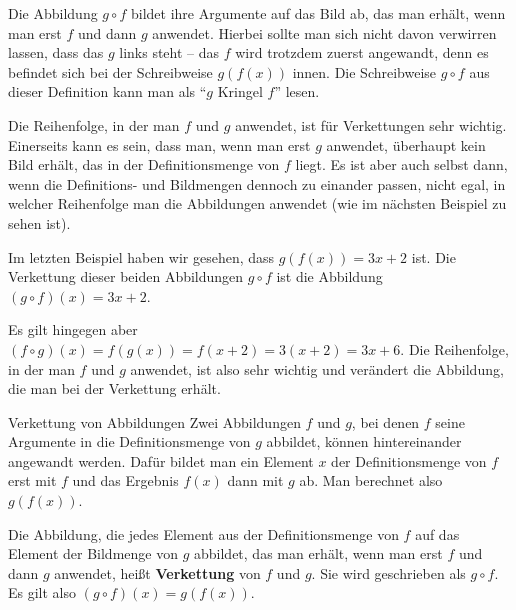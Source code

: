 \documentclass[../../main.tex]{subfiles}
\begin{document}
Die Abbildung $g\circ f$ bildet ihre Argumente auf das Bild ab, das man erhält, wenn man erst $f$ und dann $g$ anwendet. Hierbei sollte man sich nicht davon verwirren lassen, dass das $g$ links steht -- das $f$ wird trotzdem zuerst angewandt, denn es befindet sich bei der Schreibweise $g(f(x))$ innen. Die Schreibweise $g\circ f$ aus dieser Definition kann man als \enquote{$g$ Kringel $f$} lesen.

Die Reihenfolge, in der man $f$ und $g$ anwendet, ist für Verkettungen sehr wichtig. Einerseits kann es sein, dass man, wenn man erst $g$ anwendet, überhaupt kein Bild erhält, das in der Definitionsmenge von $f$ liegt. Es ist aber auch selbst dann, wenn die Definitions- und Bildmengen dennoch zu einander passen, nicht egal, in welcher Reihenfolge man die Abbildungen anwendet (wie im nächsten Beispiel zu sehen ist).

\begin{example}{}
    Im letzten Beispiel haben wir gesehen, dass $g(f(x))=3x+2$ ist. Die Verkettung dieser beiden Abbildungen $g\circ f$ ist die Abbildung $(g\circ f)(x)=3x+2$.
    
    Es gilt hingegen aber $(f\circ g)(x)=f(g(x))=f(x+2)=3(x+2)=3x+6$. Die Reihenfolge, in der man $f$ und $g$ anwendet, ist also sehr wichtig und verändert die Abbildung, die man bei der Verkettung erhält.
\end{example}

\begin{nutshell}{Verkettung von Abbildungen}
    \parpic[r]{}
    Zwei Abbildungen $f$ und $g$, bei denen $f$ seine Argumente in die Definitionsmenge von $g$ abbildet, können hintereinander angewandt werden. Dafür bildet man ein Element $x$ der Definitionsmenge von $f$ erst mit $f$ und das Ergebnis $f(x)$ dann mit $g$ ab. Man berechnet also $g(f(x))$.
      
    Die Abbildung, die jedes Element aus der Definitionsmenge von $f$ auf das Element der Bildmenge von $g$ abbildet, das man erhält, wenn man erst $f$ und dann $g$ anwendet, heißt \textbf{Verkettung} von $f$ und $g$. Sie wird geschrieben als $g\circ f$. Es gilt also $(g\circ f)(x)=g(f(x))$.
\end{nutshell}
\end{document}

